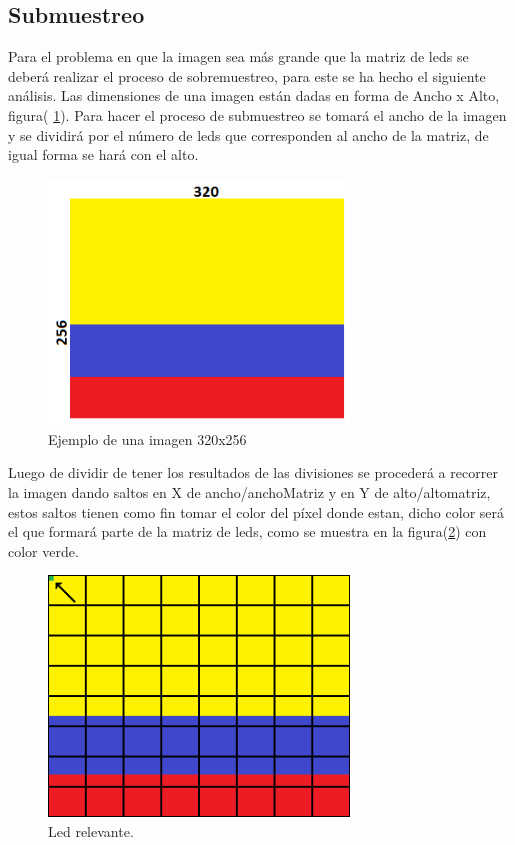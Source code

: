 \documentclass{article}
\begin{document}
\subsection{Submuestreo}
Para el problema en que la imagen sea más grande que la matriz de leds se deberá realizar el proceso de sobremuestreo, para este se ha hecho el siguiente análisis.
Las dimensiones de una imagen están dadas en forma de Ancho x Alto, figura( \ref{fig:ejemplo1}). Para hacer el proceso de submuestreo se tomará el ancho de la imagen y se dividirá por el número de leds que corresponden al ancho de la matriz, de igual forma se hará con el alto.
    \begin{figure}[h]
    \includegraphics[width=8cm]{ejemplo320x256.png}
    \centering
    \caption{Ejemplo de una imagen 320x256}
    \label{fig:ejemplo1}
    \end{figure}
Luego de dividir de tener los resultados de las divisiones se procederá a recorrer la imagen dando saltos en X de ancho/anchoMatriz y en Y de alto/altomatriz, estos saltos tienen como fin tomar el color del píxel donde estan, dicho color será el que formará parte de la matriz de leds, como se muestra en la figura(\ref{fig:ledrelevante}) con color verde.
    \begin{figure}[h]
    \includegraphics[width=8cm]{ledImportante.png}
    \centering
    \caption{Led relevante.}
    \label{fig:ledrelevante}
    \end{figure}
\end{document}
